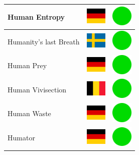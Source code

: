 \documentclass[12pt, a4paper, twoside]{report}
\begin{document}
\begin{center}
\begin{longtable}{|p{5cm}|p{2cm}|p{2cm}|}
 Human Entropy                                              & \includegraphics[width=1cm]{../img/flags/de} &   \includegraphics[width=1cm]{../likes/y} \\ \hline
 Humanity's last Breath                                     & \includegraphics[width=1cm]{../img/flags/se} &   \includegraphics[width=1cm]{../likes/y} \\ \hline
 Human Prey                                                 & \includegraphics[width=1cm]{../img/flags/de} &   \includegraphics[width=1cm]{../likes/y} \\ \hline
 Human Vivisection                                          & \includegraphics[width=1cm]{../img/flags/be} &   \includegraphics[width=1cm]{../likes/y} \\ \hline
 Human Waste                                                & \includegraphics[width=1cm]{../img/flags/de} &   \includegraphics[width=1cm]{../likes/y} \\ \hline
 Humator                                                    & \includegraphics[width=1cm]{../img/flags/de} &   \includegraphics[width=1cm]{../likes/y} \\ \hline

\end{longtable}
\end{center}
\end{document}
